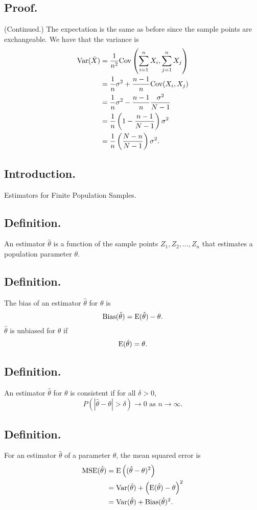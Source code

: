 \documentclass[titlepage]{article}
\begin{document}
\subsection{Proof.} (Continued.) The expectation is the same as before since the sample points are exchangeable. We have that the variance is 
\begin{align*}
    \text{Var}(\bar{X}) &= \frac{1}{n^{2}}\text{Cov}\left(\sum_{i=1}^{n}X_{i}, \sum_{j=1}^{n}X_{j}\right) \\
                  &= \frac{1}{n}\sigma^{2} + \frac{n-1}{n}\text{Cov}(X_{i}, X_{j}) \\
                  &= \frac{1}{n}\sigma^{2} - \frac{n-1}{n}\frac{\sigma^{2}}{N-1} \\
                  &= \frac{1}{n}\left(1 - \frac{n-1}{N-1}\right)\sigma^{2} \\
                  &= \frac{1}{n}\left(\frac{N-n}{N-1}\right)\sigma^{2}.
\end{align*}

\newpage {}

\subsection{Introduction.} Estimators for Finite Population Samples.

\subsection{Definition.} An estimator $\hat{\theta}$ is a function of the sample points $Z_{1}, Z_{2}, \ldots, Z_{n}$ that estimates a population parameter $\theta$.

\subsection{Definition.} The bias of an estimator $\hat{\theta}$ for $\theta$ is 
$$\text{Bias}(\hat{\theta}) = \text{E}(\hat{\theta}) - \theta.$$
$\hat{\theta}$ is unbiased for $\theta$ if
$$\text{E}(\hat{\theta}) = \theta.$$

\subsection{Definition.} An estimator $\hat{\theta}$ for $\theta$ is consistent if for all $\delta > 0$, 
$$P(|\hat{\theta} - \theta| > \delta) \to 0 \text{ as } n \to \infty.$$

\subsection{Definition.} For an estimator $\hat{\theta}$ of a parameter $\theta$, the mean squared error is 
\begin{align*}
    \text{MSE}(\hat{\theta}) &= \text{E}\left((\hat{\theta} - \theta)^{2}\right) \\
                       &= \text{Var}(\hat{\theta}) + \left(\text{E}(\hat{\theta}) - \theta\right)^{2} \\
                       &= \text{Var}(\hat{\theta}) + \text{Bias}(\hat{\theta})^{2}.
\end{align*}
\end{document}
